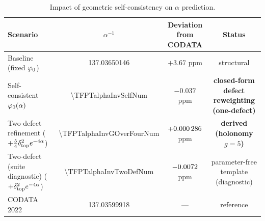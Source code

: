 \begin{table}[H]
\centering
\begin{tabular}{@{}lccc@{}}
\toprule
\textbf{Scenario} & $\alpha^{-1}$ & \textbf{Deviation from CODATA} & \textbf{Status}\\
\midrule
Baseline (fixed $\varphi_0$) & 137.03650146 & $+3.67$ ppm & structural\\
Self-consistent $\varphi_0(\alpha)$ & \num[round-mode=places,round-precision=10]{\TFPTalphaInvSelfNum} & $-0.037$ ppm & \textbf{closed-form defect reweighting (one-defect)}\\
Two-defect refinement ($+\tfrac54\delta_{\mathrm{top}}^2 e^{-4\alpha}$) & \num[round-mode=places,round-precision=12]{\TFPTalphaInvGOverFourNum} & $+\num[round-mode=places,round-precision=6]{\TFPTalphaPpmGOverFourNum}$ ppm & \textbf{derived (holonomy $g=5$)}\\
Two-defect (suite diagnostic) ($+\delta_{\mathrm{top}}^2 e^{-4\alpha}$) & \num[round-mode=places,round-precision=10]{\TFPTalphaInvTwoDefNum} & $\num[round-mode=places,round-precision=4]{\TFPTalphaPpmTwoDefNum}$ ppm & parameter-free template (diagnostic)\\
CODATA 2022 & 137.03599918 & --- & reference\\
\bottomrule
\end{tabular}
\caption{Impact of geometric self-consistency on $\alpha$ prediction.}
\label{tab:alpha}
\end{table}

\TFPTAlphaAuditTable

